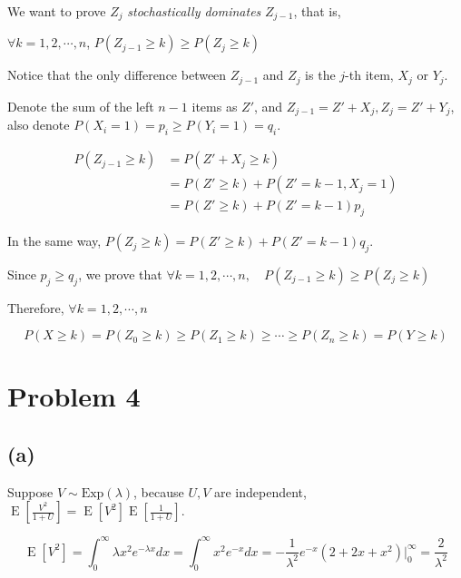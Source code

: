 \documentclass{article}
\begin{document}
We want to prove $Z_{j}$ \textit{stochastically dominates} $Z_{j-1}$, that is,

$\forall k = 1,2,\cdots,n$, $P(Z_{j-1}\geqslant k) \geqslant P(Z_j\geqslant k)$

Notice that the only difference between $Z_{j-1}$ and $Z_j$ is the $j$-th item, $X_{j}$ or $Y_{j}$. 

Denote the sum of the left $n-1$ items as $Z'$, and $Z_{j-1} = Z'+X_{j},Z_{j}=Z'+Y_{j}$, also denote $P(X_{i} =1) = p_i \geqslant P(Y_{i} =1) = q_i$.

\begin{equation}
\begin{aligned}
    P(Z_{j-1}\geqslant k) &=  P(Z'+X_j \geqslant k) \\ &= P(Z'\geqslant k) + P(Z' = k-1,X_j=1) \\ &= P(Z'\geqslant k)+ P(Z' = k-1)p_j 
\end{aligned}
\end{equation}

In the same way, $ P(Z_{j}\geqslant k) = P(Z'\geqslant k)+ P(Z' = k-1)q_j $.

Since $p_j \geqslant q_j$, we prove that $\forall k = 1,2,\cdots,n,\quad P(Z_{j-1}\geqslant k) \geqslant P(Z_j\geqslant k)$


Therefore, $\forall k = 1,2,\cdots,n$

\begin{equation}
    P(X\geqslant k) = P(Z_{0}\geqslant k) \geqslant P(Z_{1}\geqslant k) \geqslant \cdots \geqslant P(Z_{n}\geqslant k) = P(Y \geqslant k)
\end{equation}

\section{Problem 4}

\subsection{(a)}

Suppose $V \sim \text{Exp}(\lambda)$, because $U,V$ are independent, $\operatorname{E}\left[\frac{V^2}{1+U}\right]= \operatorname{E}[V^2] \operatorname{E}\left[\frac{1}{1+U}\right]$.

\begin{equation}
    \operatorname{E}[V^2]  = \int_{0}^{\infty} \lambda x^2 e^{-\lambda x} dx = \int_{0}^{\infty} x^2 e^{- x} dx = -\frac{1}{\lambda^2} e^{-x} (2 + 2 x + x^2) \big|_{0}^{\infty} = \frac{2}{\lambda^2}
\end{equation}
\end{document}
